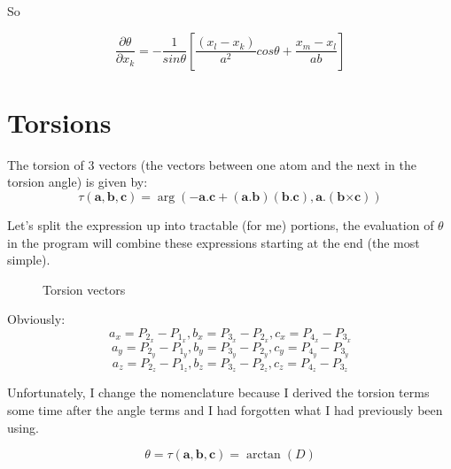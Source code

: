 \documentclass[a4paper,twocolumn,9pt]{article}
\begin{document}
So 

\begin{equation}
  \frac{\partial \theta}{\partial x_k} = -\frac{1}{sin\theta} [\frac{(x_l-x_k)}{a^2}cos\theta + \frac{x_m-x_l}{ab}]
\end{equation}



\section{Torsions}
The torsion of 3 vectors (the vectors between one atom and the next in
the torsion angle) is given by:
\begin{equation}
  \label{eq:8}
  \tau(\mathbf{a},\mathbf{b},\mathbf{c}) = \arg(-\mathbf{a}.\mathbf{c}+(\mathbf{a}.\mathbf{b})(\mathbf{b}.\mathbf{c}), \mathbf{a}.(\mathbf{b} \mathbf{\times}\mathbf{c}))
\end{equation}


Let's split the expression up into tractable (for me) portions, the
evaluation of $\theta$ in the program will combine these expressions
starting at the end (the most simple).

\begin{figure}[htbp]
  \centering
  \leavevmode
  \epsfxsize=50mm
  \caption{Torsion vectors}
  \label{fig:torsion-vectors}
\end{figure}

Obviously: 
\begin{displaymath}
  a_x = P_{2_x}-P_{1_x} , b_x = P_{3_x}-P_{2_x} , c_x = P_{4_x}-P_{3_x}
\end{displaymath}
\begin{displaymath}
  a_y = P_{2_y}-P_{1_y} , b_y = P_{3_y}-P_{2_y} , c_y = P_{4_y}-P_{3_y}
\end{displaymath}
\begin{displaymath}
  a_z = P_{2_z}-P_{1_z} , b_z = P_{3_z}-P_{2_z} , c_z = P_{4_z}-P_{3_z}
\end{displaymath}

Unfortunately, I change the nomenclature because I derived the torsion
terms some time after the angle terms and I had forgotten what I had
previously been using.


\begin{displaymath}
  \theta = \tau(\mathbf{a},\mathbf{b},\mathbf{c}) =  \arctan(D)
\end{displaymath}
\end{document}
